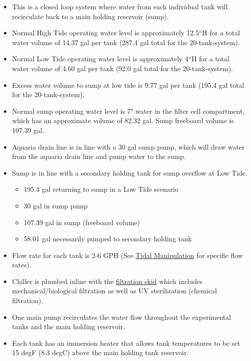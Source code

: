 \documentclass[]{book}
\providecommand{\tightlist}{%
  \setlength{\itemsep}{0pt}\setlength{\parskip}{0pt}}
\begin{document}
\begin{itemize}
\tightlist
\item
  This is a closed loop system where water from each individual tank
  will recirculate back to a main holding reservoir (sump).\\
\item
  Normal High Tide operating water level is approximately 12.5``H for a
  total water volume of 14.37 gal per tank (287.4 gal total for the
  20-tank-system).\\
\item
  Normal Low Tide operating water level is approximately 4``H for a
  total water volume of 4.60 gal per tank (92.0 gal total for the
  20-tank-system).\\
\item
  Excess water volume to sump at low tide is 9.77 gal per tank (195.4
  gal total for the 20-tank-system).\\
\item
  Normal sump operating water level is 7" water in the filter cell
  compartment, which has an approximate volume of 82.32 gal. Sump
  freeboard volume is 107.39 gal.\\
\item
  Aquaria drain line is in line with a 30 gal sump pump, which will draw
  water from the aquaria drain line and pump water to the sump.\\
\item
  Sump is in line with a secondary holding tank for sump overflow at Low
  Tide.

  \begin{itemize}
  \tightlist
  \item
    195.4 gal returning to sump in a Low Tide scenario
  \item
    30 gal in sump pump
  \item
    107.39 gal in sump (freeboard volume)
  \item
    58.01 gal necessarily pumped to secondary holding tank\\
  \end{itemize}
\item
  Flow rate for each tank is 2-6 GPH (See
  \href{chapters/06-tidal_manipulation.md}{Tidal Manipulation} for
  specific flow rates).\\
\item
  Chiller is plumbed inline with the
  \href{https://github.com/SilbigerLab/Mesocosm_User_Manual/blob/master/Manuals/Filtration_Skid_Build_Package.pdf}{filtration
  skid} which includes mechanical/biological filtration as well as UV
  sterilization (chemical filtration).\\
\item
  One main pump recirculates the water flow throughout the experimental
  tanks and the main holding reservoir.\\
\item
  Each tank has an immersion heater that allows tank temperatures to be
  set 15 degF (8.3 degC) above the main holding tank reservoir.


\end{itemize}
\end{document}
